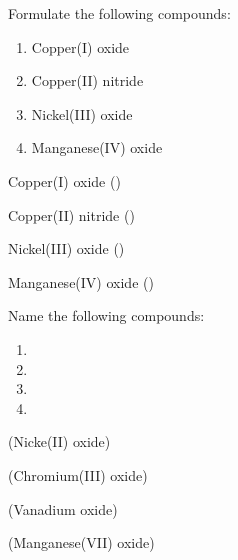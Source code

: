 \documentclass[main.tex]{subfiles}
\begin{document}
\begin{multicols*}{2}
\begin{question}[ID=\the\value{numA}]
Formulate the following compounds:
 \begin{multicols}{2}
 \noindent
  \begin{enumerate} [topsep=0pt, partopsep=0pt, label=(\alph*), leftmargin=.4cm]
\item  Copper(I) oxide %
\item  Copper(II) nitride %
\item  Nickel(III) oxide %
\item  Manganese(IV) oxide %
\end{enumerate}
\end{multicols}
\end{question}
\begin{solution}
\begin{inparaenum}[(a)]
\item  Copper(I) oxide  ()
\item  Copper(II) nitride  ()
\item  Nickel(III) oxide  ()
\item  Manganese(IV) oxide  ()
\end{inparaenum}\hspace{0.1cm}\end{solution}

\begin{question}[ID=\the\value{numA}]
Name the following compounds:
 \begin{multicols}{2}
  \noindent
  \begin{enumerate} [topsep=0pt, partopsep=0pt, label=(\alph*), leftmargin=.5cm]
\item  {} %
\item  {} %
\item  {} %
\item  {} %
\end{enumerate} \end{multicols}

\end{question}
\begin{solution}
\begin{inparaenum}[(a)]
\item  {}  (Nicke(II) oxide)
\item  {}  (Chromium(III) oxide)
\item  {}  (Vanadium oxide)
\item  {}  (Manganese(VII) oxide)
\end{inparaenum}\hspace{0.1cm}\end{solution}



\end{multicols*}
\end{document}
